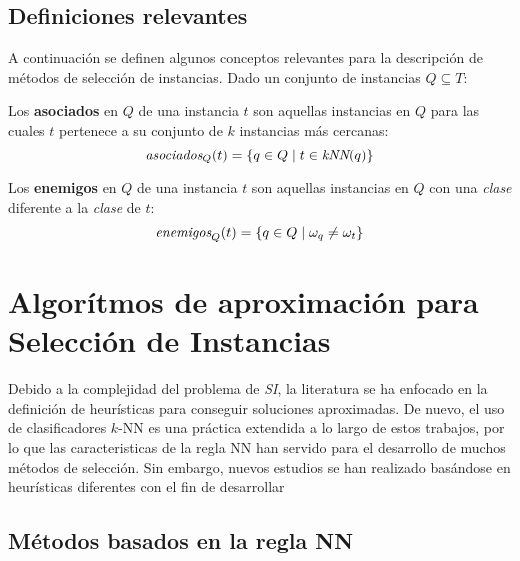 \subsection{Definiciones relevantes}

A continuación se definen algunos conceptos relevantes para la descripción de métodos de selección de instancias. Dado un conjunto de instancias $Q \subseteq T$:

\begin{definicion}
Los \textbf{asociados} en $Q$ de una instancia $t$ son aquellas instancias en $Q$ para las cuales $t$ pertenece a su conjunto de $k$ instancias más cercanas:
\begin{equation}
\emph{asociados}_Q(t) = \left\lbrace q \in Q \mid t\in \emph{kNN}(q) \right\rbrace
\end{equation}
\end{definicion}

\begin{definicion}
Los \textbf{enemigos} en $Q$ de una instancia $t$ son aquellas instancias en $Q$ con una \emph{clase} diferente a la \emph{clase} de $t$:
\begin{equation}
\emph{enemigos}_Q(t) = \left\lbrace q \in Q \mid \omega_{q} \neq \omega_{t} \right\rbrace
\end{equation}
\end{definicion}

\section{Algorítmos de aproximación para Selección de Instancias}
\label{alg-aprox-si}

Debido a la complejidad del problema de \emph{SI}, la literatura se ha enfocado en la definición de heurísticas para conseguir soluciones aproximadas. De nuevo, el uso de clasificadores $k$-NN es una práctica extendida a lo largo de estos trabajos, por lo que las caracteristicas de la regla NN han servido para el desarrollo de muchos métodos de selección. Sin embargo, nuevos estudios se han realizado basándose en heurísticas diferentes con el fin de desarrollar 

\subsection{Métodos basados en la regla NN}

